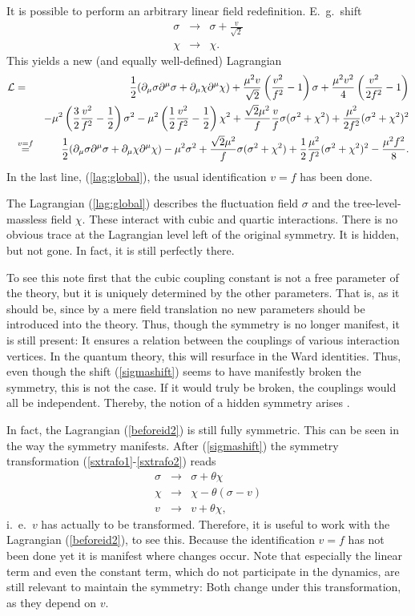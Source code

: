 \documentclass[final,12pt]{article}
\newcommand*{\La}{{\cal{L}}}
\newcommand*{\no}{\noindent}
\newcommand*{\bea}{\begin{eqnarray}}
\newcommand*{\eea}{\end{eqnarray}}
\newcommand*{\pd}{\partial}
\newcommand*{\pdm}{\pd_{\mu}}
\newcommand*{\pref}[1]{(\ref{#1})}
\newcommand*{\prefr}[2]{(\ref{#1}-\ref{#2})}
\newcommand*{\nn}{\nonumber}
\newcommand*{\1}{1\!\!\!\bot}
\begin{document}
It is possible to perform an arbitrary linear field redefinition. E.\ g.\ shift
\bea
\sigma&\to&\sigma+\frac{v}{\sqrt{2}}\label{sigmashift}\\
\chi&\to&\chi\nn.
\eea
\no This yields a new (and equally well-defined) Lagrangian
\bea
\La&=&\frac{1}{2}(\pdm\sigma\pd^\mu\sigma+\pdm\chi\pd^\mu\chi)+\frac{\mu^2v}{\sqrt{2}}\left(\frac{v^2}{f^2}-1\right)\sigma+\frac{\mu^2v^2}{4}\left(\frac{v^2}{2f^2}-1\right)\nn\\
&&-\mu^2\left(\frac{3}{2}\frac{v^2}{f^2}-\frac{1}{2}\right)\sigma^2-\mu^2\left(\frac{1}{2}\frac{v^2}{f^2}-\frac{1}{2}\right)\chi^2+\frac{\sqrt{2}\mu^2}{f}\frac{v}{f}\sigma(\sigma^2+\chi^2)+\frac{\mu^2}{2f^2}(\sigma^2+\chi^2)^2\label{beforeid2}\\
&\stackrel{v=f}{=}&\frac{1}{2}(\pdm\sigma\pd^\mu\sigma+\pdm\chi\pd^\mu\chi)-\mu^2\sigma^2+\frac{\sqrt{2}\mu^2}{f}\sigma(\sigma^2+\chi^2)+\frac{1}{2}\frac{\mu^2}{f^2}(\sigma^2+\chi^2)^2-\frac{\mu^2f^2}{8}\label{lag:global}.
\eea
\no In the last line, \pref{lag:global}, the usual \cite{Bohm:2001yx} identification $v=f$ has been done.

The Lagrangian \pref{lag:global} describes the fluctuation field $\sigma$ and the tree-level-massless field $\chi$. These interact with cubic and quartic interactions. There is no obvious trace at the Lagrangian level left of the original symmetry. It is hidden, but not gone. In fact, it is still perfectly there. 

To see this note first that the cubic coupling constant is not a free parameter of the theory, but it is uniquely determined by the other parameters. That is, as it should be, since by a mere field translation no new parameters should be introduced into the theory. Thus, though the symmetry is no longer manifest, it is still present: It ensures a relation between the couplings of various interaction vertices. In the quantum theory, this will resurface in the Ward identities. Thus, even though the shift \pref{sigmashift} seems to have manifestly broken the symmetry, this is not the case. If it would truly be broken, the couplings would all be independent. Thereby, the notion of a hidden symmetry arises \cite{O'Raifeartaigh:1978kv}.

In fact, the Lagrangian \pref{beforeid2} is still fully symmetric. This can be seen in the way the symmetry manifests. After \pref{sigmashift} the symmetry transformation \prefr{sxtrafo1}{sxtrafo2} reads
\bea
\sigma&\to&\sigma+\theta\chi\nn\\
\chi&\to&\chi-\theta(\sigma-v)\nn\\
v&\to&v+\theta\chi\nn,
\eea
\no i.\ e.\ $v$ has actually to be transformed. Therefore, it is useful to work with the Lagrangian \pref{beforeid2}, to see this. Because the identification $v=f$ has not been done yet it is manifest where changes occur. Note that especially the linear term and even the constant term, which do not participate in the dynamics, are still relevant to maintain the symmetry: Both change under this transformation, as they depend on $v$.
\end{document}
